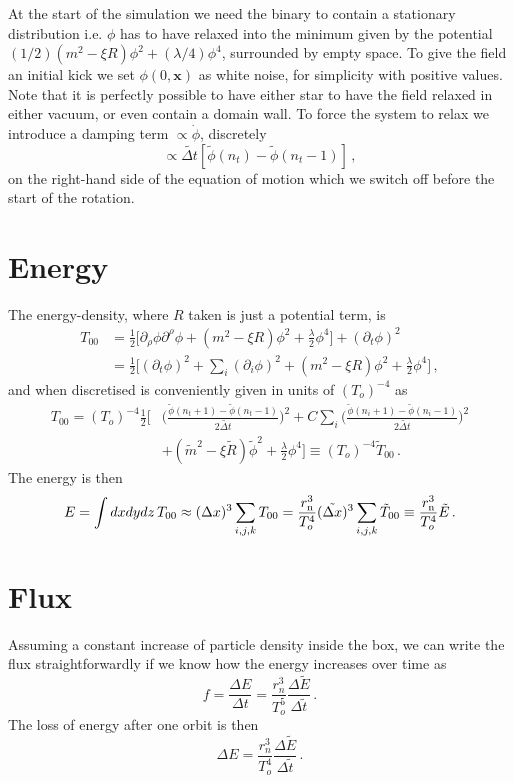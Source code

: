 \documentclass[a4paper,11pt]{article}
\newcommand{\ee}[1]{\begin{equation}#1\end{equation}}
\newcommand{\ea}[1]{\begin{align}#1\end{align}}
\providecommand{\f}[2]{\frac{{#1}}{{#2}}}
\begin{document}
At the start of the simulation we need the binary to contain a stationary distribution i.e. $\phi$ has to have relaxed into the minimum given by the potential $(1/2)(m^2-\xi R)\phi^2 +(\lambda/4)\phi^4$, surrounded by empty space. To give the field an initial kick we set $\phi(0,\mathbf{x})$ as white noise, for simplicity with positive values. Note that it is perfectly possible to have either star to have the field  relaxed in either vacuum, or even contain a domain wall. To force the system to relax we introduce a damping term $\propto \dot{\phi}$, discretely
\ee{\propto\tilde{\Delta t}\left[\tilde{\phi}(n_t)-\tilde{\phi}(n_t-1)\right]\,,}
on the right-hand side of the equation of motion which we switch off before the start of the rotation.
\section{Energy}
The energy-density, where $R$ taken is just a potential term, is 
\ea{T_{00} &=\f12\bigg[\partial_\rho\phi\partial^\rho\phi+(m^2-\xi R)\phi^2+\f{\lambda}{2}\phi^4\bigg]+(\partial_t\phi)^2\nonumber\\ &=\f12\bigg[(\partial_t \phi)^2+\sum_i(\partial_i \phi)^2+(m^2-\xi R)\phi^2+\f{\lambda}{2}\phi^4\bigg] \,,}
 and when discretised is conveniently given in units of $(T_o)^{-4}$ as
\ea{T_{00} = (T_o)^{-4}\f12\bigg[&\bigg(\f{\tilde{\phi}(n_t+1)-\tilde{\phi}(n_t-1)}{2\tilde{\Delta t}}\bigg)^2+C\sum_i\bigg(\f{\tilde{\phi}(n_{i}+1)-\tilde{\phi}(n_i-1)}{2\tilde{\Delta t}}\bigg)^2\nonumber \\&+(\tilde{m}^2-\xi \tilde{R})\tilde{\phi}^2+\f{\lambda}{2}\phi^4\bigg]\equiv(T_o)^{-4} \tilde{T}_{00}\,.}
The energy is then
\ee{E=\int dxdydz\,T_{00}\approx(\Delta x)^3\sum_{i,j,k}T_{00}=\f{r_{\rm n}^3}{T_o^4}(\tilde{\Delta x})^3\sum_{i,j,k}\tilde{T}_{00}\equiv\f{r_{\rm n}^3}{T_o^4}\tilde{E}\,.}
\section{Flux}
Assuming a constant increase of particle density inside the box, we can write the flux straightforwardly if we know how the energy increases over time as
\ee{f = \f{\Delta E}{\Delta t}  = \f{r_n^3}{T_o^5}\f{\Delta \tilde{E}}{\Delta \tilde{t}}\,.}
The loss of energy after one orbit is then
\ee{\Delta E = \f{r_n^3}{T_o^4}\f{\Delta \tilde{E}}{\Delta \tilde{t}}\,.}
\end{document}
